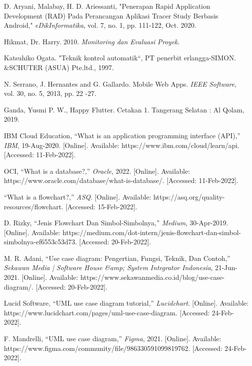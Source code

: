 \begin{thebibliography}{7}
D. Aryani, Malabay, H. D. Ariessanti, "Penerapan Rapid Application Development (RAD) Pada Perancangan Aplikasi Tracer Study Berbasis Android," \emph{eDikInformatika}, vol. 7, no. 1, pp. 111-122, Oct. 2020.

Hikmat, Dr. Harry. 2010. \emph{Monitoring dan Evaluasi Proyek}.

Katsuhiko Ogata. "Teknik kontrol automatik“, PT penerbit erlangga-SIMON. \&SCHUTER (ASUA) Pte.ltd., 1997.

N. Serrano, J. Hernantes and G. Gallardo. Mobile Web Apps. \emph{IEEE Software}, vol. 30, no. 5, 2013, pp. 22 -27.

Ganda, Yusmi P. W., Happy Flutter. Cetakan 1. Tangerang Selatan : Al Qolam, 2019.

IBM Cloud Education, “What is an application programming interface (API),” \emph{IBM}, 19-Aug-2020. [Online]. Available: https://www.ibm.com/cloud/learn/api. [Accessed: 11-Feb-2022]. 

OCI, “What is a database?,” \emph{Oracle}, 2022. [Online]. Available: https://www.oracle.com/database/what-is-database/. [Accessed: 11-Feb-2022]. 

“What is a flowchart?,” \emph{ASQ}. [Online]. Available: https://asq.org/quality-resources/flowchart. [Accessed: 15-Feb-2022]. 

D. Rizky, “Jenis Flowchart Dan Simbol-Simbolnya,” \emph{Medium}, 30-Apr-2019. [Online]. Available: https://medium.com/dot-intern/jenis-flowchart-dan-simbol-simbolnya-ef6553c53d73. [Accessed: 20-Feb-2022]. 

M. R. Adani, “Use case diagram: Pengertian, Fungsi, Teknik, Dan Contoh,” \emph{Sekawan Media | Software House \&amp; System Integrator Indonesia}, 21-Jun-2021. [Online]. Available: https://www.sekawanmedia.co.id/blog/use-case-diagram/. [Accessed: 20-Feb-2022]. 

Lucid Software, “UML use case diagram tutorial,” \emph{Lucidchart}. [Online]. Available: https://www.lucidchart.com/pages/uml-use-case-diagram. [Accessed: 24-Feb-2022]. 

F. Mandrelli, “UML use case diagram,” \emph{Figma}, 2021. [Online]. Available: https://www.figma.com/community/file/986330591099819762. [Accessed: 24-Feb-2022]. 


\end{thebibliography}

